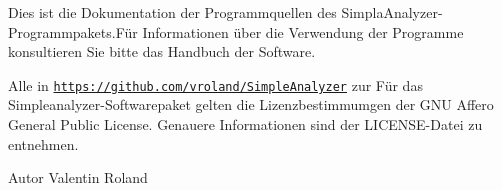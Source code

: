 Dies ist die Dokumentation der Programmquellen des Simpla\-Analyzer-\/\-Programmpakets.\-Für Informationen über die Verwendung der Programme konsultieren Sie bitte das Handbuch der Software.

Alle in \href{https://github.com/vroland/SimpleAnalyzer}{\tt https\-://github.\-com/vroland/\-Simple\-Analyzer} zur Für das Simpleanalyzer-\/\-Softwarepaket gelten die Lizenzbestimmumgen der G\-N\-U Affero General Public License. Genauere Informationen sind der L\-I\-C\-E\-N\-S\-E-\/\-Datei zu entnehmen.

\begin{DoxyAuthor}{Autor}
Valentin Roland 
\end{DoxyAuthor}

